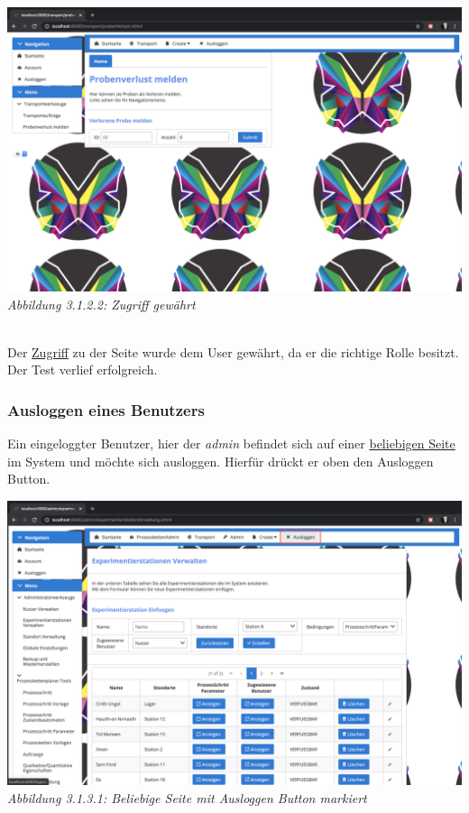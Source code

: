 \documentclass[enabledeprecatedfontcommands,fontsize=12pt,paper=a4,twoside]{scrartcl}
\begin{document}
\hypertarget{sc3.1.2.2.1}{
\includegraphics[width=1\textwidth]{Screenshots/3122.png}
\textit{Abbildung 3.1.2.2: Zugriff gewährt}
} \\

Der  \hyperlink{sc3.1.2.1.1}{Zugriff} zu der Seite wurde dem User gewährt, da er die richtige Rolle besitzt. Der Test verlief erfolgreich. 


\subsubsection{Ausloggen eines Benutzers}

Ein eingeloggter Benutzer, hier der \textit{admin} befindet sich auf einer \hyperlink{sc3.1.3.1.1}{beliebigen Seite} im System und möchte sich ausloggen. Hierfür drückt er oben den Ausloggen Button. 

\hypertarget{sc3.1.3.1.1}{
\includegraphics[width=1\textwidth]{Screenshots/31131.png}
\textit{Abbildung 3.1.3.1: Beliebige Seite mit Ausloggen Button markiert}
} \\
\end{document}
